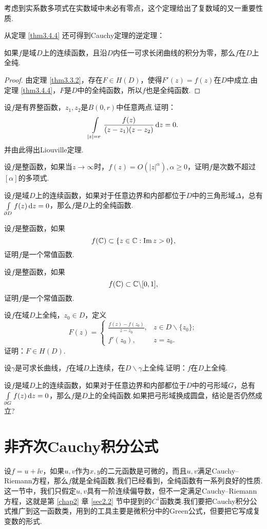 考虑到实系数多项式在实数域中未必有零点，这个定理给出了复数域的又一重要性质.

从定理 \ref{thm3.4.4} 还可得到Cauchy定理的逆定理：
\begin{theorem}\label{thm3.5.4}
  如果$f$是域$D$上的连续函数，且沿$D$内任一可求长闭曲线的积分为零，那么$f$在$D$上全纯.
\end{theorem}
\begin{proof}
  由定理 \ref{thm3.3.2}，存在$F\in H(D)$，使得$F'(z)=f(z)$在$D$中成立.由定理 \ref{thm3.4.4}，$F$是$D$中的全纯函数，所以$f$也是全纯函数.
\end{proof}
\begin{xiti}
  \item 设$f$是有界整函数，$z_1,z_2$是$B(0,r)$中任意两点.证明：
    \[
      \int\limits_{|z|=r} \frac{f(z)}{(z-z_1)(z-z_2)}\mathop{}\!\mathrm dz = 0.
    \]
    并由此得出Liouville定理.
  \item 设$f$是整函数，如果当$z\to\infty$时，$f(z)=O(|z|^\alpha),\alpha\ge0$，证明$f$是次数不超过$[\alpha]$的多项式.
  \item 设$f$是域$D$上的连续函数，如果对于任意边界和内部都位于$D$中的三角形域$\varDelta$，总有$\int\limits_{\partial D}f(z)\mathop{}\!\mathrm dz=0$，那么$f$是$D$上的全纯函数.
  \item 设$f$是整函数，如果
    \[
      f(\mathbb C)\subset\{z\in\mathbb C:\operatorname{Im} z>0\},
    \]
    证明$f$是一个常值函数.
  \item 设$f$是整函数，如果
    \[
      f(\mathbb C)\subset \mathbb C\backslash[0,1],
    \]
    证明$f$是一个常值函数.
  \item 设$f$在域$D$上全纯，$z_0\in D$，定义
    \[
      F(z) = \begin{cases}
        \frac{f(z)-f(z_0)}{z-z_0}, & z\in D\backslash\{z_0\};\\
        f'(z_0), & z = z_0.
      \end{cases}
    \]
    证明：$F\in H(D)$.
  \item 设$\gamma$是可求长曲线，$f$在域$D$上连续，在$D\backslash\gamma$上全纯.证明：$f$在$D$上全纯.
  \item 设$f$是域$D$上的连续函数，如果对于任意边界和内部都位于$D$中的弓形域$G$，总有$\int\limits_{\partial G}f(z)\mathop{}\!\mathrm dz=0$，那么$f$是$D$上的全纯函数.如果把弓形域换成圆盘，结论是否仍然成立?
\end{xiti}

\section{非齐次Cauchy积分公式\label{sec3.6}}
设$f=u+\ii v$，如果$u,v$作为$x,y$的二元函数是可微的，而且$u,v$满足Cauchy--Riemann方程，那么$f$就是全纯函数.我们已经看到，全纯函数有一系列良好的性质.这一节中，我们只假定$u,v$具有一阶连续偏导数，但不一定满足Cauchy--Riemann方程，这就是第 \ref{chap2} 章 \ref{sec2.2} 节中提到的$C^1$函数类.我们要把Cauchy积分公式推广到这一函数类，用到的工具主要是微积分中的Green公式，但要把它写成复变数的形式.

